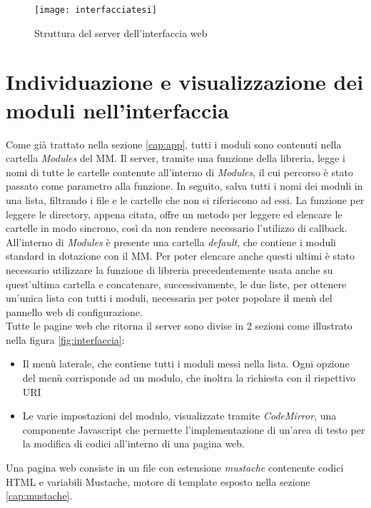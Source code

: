 \begin{figure}[H]
    \texttt{[image: interfacciatesi]}
    \caption{Struttura del server dell'interfaccia web}
    \label{fig:struttinterfaccia}
\end{figure}

\section{Individuazione e visualizzazione dei moduli nell'interfaccia}\label{cap:individuazione}
Come gi\`a trattato nella sezione \ref{cap:app}, tutti i moduli sono contenuti nella
cartella \textit{Modules} del MM. Il server, tramite una funzione della libreria,
legge i nomi di tutte le cartelle contenute all'interno di \textit{Modules}, il cui percorso \`e stato passato
come parametro alla funzione. In seguito, salva tutti i nomi dei moduli
in una lista, filtrando i file e le cartelle che non si riferiscono ad essi.
La funzione per leggere le directory, appena citata, offre un metodo per leggere ed elencare le cartelle in
modo sincrono, cos\`i da non rendere necessario l'utilizzo di callback.\\
All'interno di \textit{Modules} \`e presente una cartella \textit{default}, che contiene
i moduli standard in dotazione con il MM. Per poter elencare anche questi ultimi \`e stato necessario utilizzare la funzione
di libreria precedentemente usata anche su quest'ultima cartella e concatenare, successivamente, le due liste,
per ottenere un'unica lista con tutti i moduli, necessaria per poter popolare il men\`u del pannello web di configurazione.\\
Tutte le pagine web che ritorna il server sono divise in 2 sezioni come illustrato nella figura \ref{fig:interfaccia}:
\begin{itemize}
\item Il men\`u laterale, che contiene tutti i moduli messi nella lista. Ogni opzione del men\`u corrisponde ad un modulo, che inoltra
la richiesta con il rispettivo URI
\item Le varie impostazioni del modulo, visualizzate tramite \textit{CodeMirror}\cite{CodeMirror}, una componente Javascript
che permette l'implementazione di un'area di testo per la modifica di codici all'interno di una pagina web.\\[1\baselineskip]
\end{itemize}
Una pagina web consiste in un file con estensione \textit{mustache} contenente
codici HTML e variabili Mustache, motore di template esposto nella sezione \ref{cap:mustache}.
